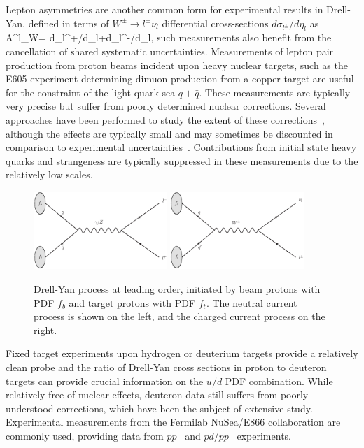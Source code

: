 Lepton asymmetries are another common form for experimental results in Drell-Yan, defined in terms of $W^{\pm}\to l^\pm\nu_l $ differential cross-sections $d\sigma_{l^\pm}/d\eta_l$ as
\be 
  A^l_W=
  {d\sigma_{l^{+}}/d\eta_{l}+d\sigma_{l^{-}}/d\eta_{l}}, 
\ee
such measurements also benefit from the cancellation of shared systematic uncertainties. Measurements of lepton pair production from proton beams incident upon heavy nuclear targets, such as the E605\cite{Moreno:1990sf} experiment determining dimuon production from a copper target are useful for the constraint of the light quark sea $q+\bar{q}$. These measurements are typically very precise but suffer from poorly determined nuclear corrections. Several approaches have been performed to study the extent of these corrections~\cite{deFlorian:2003qf,Hirai:2007sx,Kulagin:2007ju,Eskola:2009uj}, although the effects are typically small and may sometimes be discounted in comparison to experimental uncertainties~\cite{Ball:2009mk}. Contributions from initial state heavy quarks and strangeness are typically suppressed in these measurements due to the relatively low scales.

\begin{figure}[ht]
\centering
\includegraphics[width=0.45\textwidth]{3-PDFdet/figs/ncdy.eps}
\includegraphics[width=0.45\textwidth]{3-PDFdet/figs/ccdy.eps}
\caption[Leading order diagram for the Drell-Yan process]{Drell-Yan process at leading order, initiated by beam protons with PDF $f_b$ and target protons with PDF $f_t$. The neutral current process is shown on the left, and the charged current process on the right.}
\label{fig:ncdy}
\end{figure}

Fixed target experiments upon hydrogen or deuterium targets provide a relatively clean probe and the ratio of Drell-Yan cross sections in proton to deuteron targets can provide crucial information on the $u/d$ PDF combination. While relatively free of nuclear effects, deuteron data still suffers from poorly understood corrections, which have been the subject of extensive study\cite{Martin:2012da, Badelek:1994qg,Accardi:2011fa,Brady:2011hb}.
Experimental measurements from the Fermilab NuSea/E866 collaboration are commonly used, providing data from $pp$~\cite{Webb:2003bj} and $pd/pp$~\cite{Towell:2001nh} experiments.  

